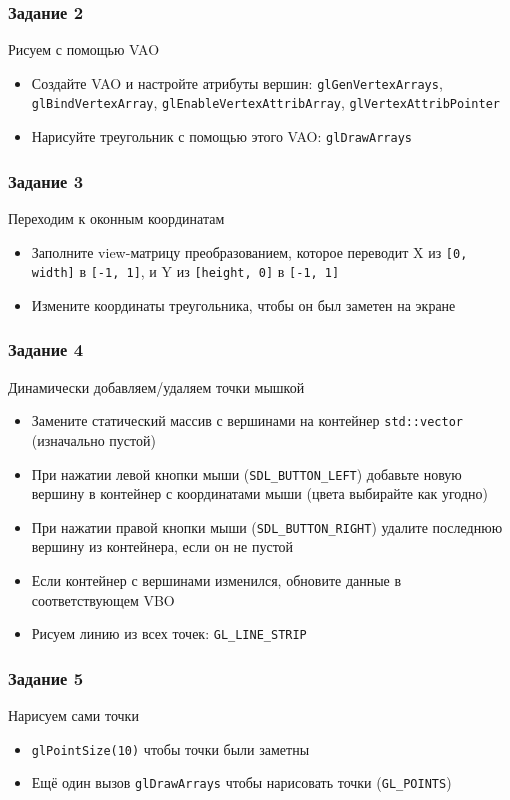 \documentclass{beamer}
\begin{document}
\begin{frame}[fragile]
\frametitle{Задание 2}
Рисуем с помощью VAO
\begin{itemize}
\item Создайте VAO и настройте атрибуты вершин: \verb|glGenVertexArrays|, \verb|glBindVertexArray|, \verb|glEnableVertexAttribArray|, \verb|glVertexAttribPointer|
\pause
\item Нарисуйте треугольник с помощью этого VAO: \verb|glDrawArrays|
\end{itemize}
\end{frame}

\begin{frame}[fragile]
\frametitle{Задание 3}
Переходим к оконным координатам
\begin{itemize}
\item Заполните view-матрицу преобразованием, которое переводит X из \verb|[0, width]| в \verb|[-1, 1]|, и Y из \verb|[height, 0]| в \verb|[-1, 1]|
\pause
\item Измените координаты треугольника, чтобы он был заметен на экране
\end{itemize}
\end{frame}

\begin{frame}[fragile]
\frametitle{Задание 4}
Динамически добавляем/удаляем точки мышкой
\begin{itemize}
\item Замените статический массив с вершинами на контейнер \verb|std::vector| (изначально пустой)
\pause
\item При нажатии левой кнопки мыши (\verb|SDL_BUTTON_LEFT|) добавьте новую вершину в контейнер с координатами мыши (цвета выбирайте как угодно)
\pause
\item При нажатии правой кнопки мыши (\verb|SDL_BUTTON_RIGHT|) удалите последнюю вершину из контейнера, если он не пустой
\pause
\item Если контейнер с вершинами изменился, обновите данные в соответствующем VBO
\pause
\item Рисуем линию из всех точек: \verb|GL_LINE_STRIP|
\end{itemize}
\end{frame}

\begin{frame}[fragile]
\frametitle{Задание 5}
Нарисуем сами точки
\begin{itemize}
\item \verb|glPointSize(10)| чтобы точки были заметны
\item Ещё один вызов \verb|glDrawArrays| чтобы нарисовать точки (\verb|GL_POINTS|)
\end{itemize}
\end{frame}
\end{document}

